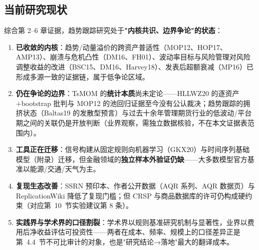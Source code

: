 \documentclass[11pt,a4paper]{article}
\begin{document}
\subsection{当前研究现状}
综合第 2--6 章证据，趋势跟踪研究处于\textbf{"内核共识、边界争论"的状态}：
\begin{enumerate}
\item \textbf{已收敛的内核}：趋势/动量溢价的跨资产普适性（MOP12、HOP17、AMP13）、崩溃与危机凸性（DM16、FH01）、波动率目标与风险管理对风险调整收益的改进（BSC15、DM16、Harvey18）、发表后超额衰减（MP16）已形成多源一致的证据链，属于低争论区域。
\item \textbf{仍在争论的边界}：TsMOM 的\textbf{统计本质}尚未定论——HLLWZ20 的逐资产+bootstrap 批判与 MOP12 的池回归证据至今没有公认裁决；趋势跟踪的拥挤状态（Baltas19 的发散型预言）与过去十余年管理期货行业的低波动/平台期之间的关联仍是开放判断（业界观察，需独立数据核验，不在本文证据表范围内）。
\item \textbf{工具正在迁移}：信号构建从固定规则向机器学习（GKX20）与时间序列基础模型（附录）迁移，但金融领域的\textbf{独立样本外验证仍缺}——大多数模型官方基准以能源/交通/天气为主。
\item \textbf{复现生态改善}：SSRN 预印本、作者公开数据（AQR 系列、AQR 数据页）与 ReplicationWiki 降低了复现门槛；但 CRSP 与商品数据库的许可仍构成硬约束（对应第~10~节实验建议第 8 条）。
\item \textbf{实践界与学术界的口径割裂}：学术界以规则基准研究机制与显著性，业界以费用后净收益评估可投资性——两者在成本、频率、规模上的口径差异正是第~4.4~节不可比审计的对象，也是"研究结论→落地"最大的翻译成本。
\end{enumerate}
\end{document}
